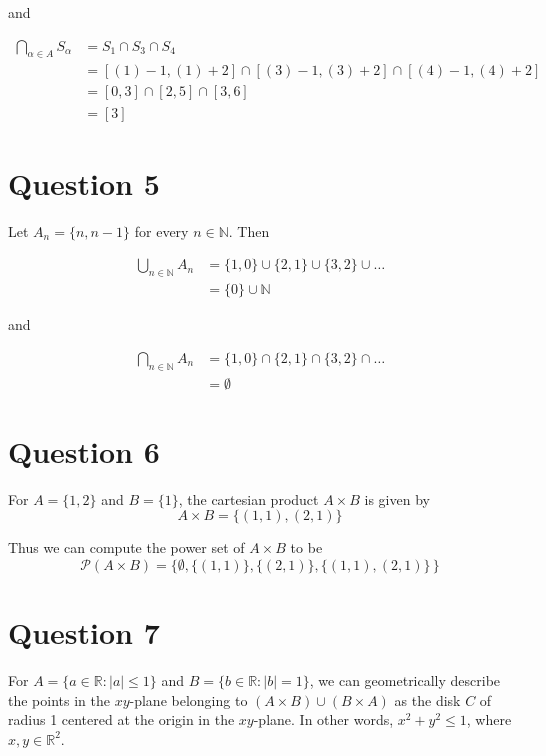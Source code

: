 \documentclass[11pt, oneside]{article}   	%
\begin{document}
and

\begin{align*}
\bigcap_{\alpha \in A} S_{\alpha} & = S_1 \cap S_3 \cap S_4 \\
& = [(1)-1, (1)+2] \cap [(3)-1, (3)+2] \cap [(4)-1, (4)+2] \\
& = [0, 3] \cap [2,5] \cap [3,6] \\
& =[3]
\end{align*}

\section*{Question 5}

Let $A_n = \{n, n-1\}$ for every $n \in \mathbb{N}$. Then

\begin{align*}
\bigcup_{n \in \mathbb{N}} A_n & = \{1,0\} \cup \{2,1\} \cup \{3,2\} \cup \dots \\
& = \{0\} \cup \mathbb{N}
\end{align*}

and

\begin{align*}
\bigcap_{n \in \mathbb{N}} A_n &  = \{1,0\} \cap \{2,1\} \cap \{3,2\} \cap \dots \\
& = \emptyset
\end{align*}


\section*{Question 6}

For $A=\{1,2\}$ and $B=\{1\}$, the cartesian product $A \times B$ is given by
$$A \times B = \{(1, 1), (2, 1)\}$$

Thus we can compute the power set of $A \times B$ to be 
$$\mathcal{P}(A \times B) = \{\emptyset, \{(1,1)\}, \{(2,1)\}, \{(1,1), (2,1)\}\,\}$$


\section*{Question 7}

For $A = \{a \in \mathbb{R} : |a| \leq 1\}$ and $B = \{b \in \mathbb{R} : |b| = 1\}$, we can geometrically describe the points in the $xy$-plane belonging to $(A \times B) \cup (B \times A)$ as the disk $C$ of radius 1 centered at the origin in the $xy$-plane. In other words, $x^2 + y^2 \leq 1$, where $x,y \in \mathbb{R}^2$.

%
%
\end{document}
